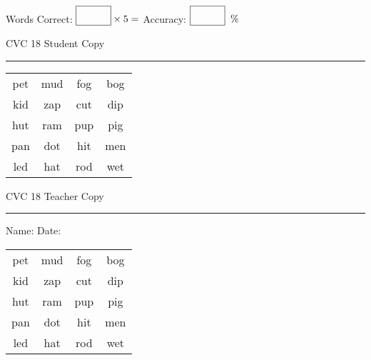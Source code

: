 \documentclass{memoir}
\begin{document}
\small

Words Correct: $\fbox{\phantom{\huge 100}} \times 5 = $ Accuracy: $\fbox{\phantom{\huge 100}}\;\; \%$ 

\vfill

\newpage


\footnotesize \noindent
CVC 18 \hfill Student Copy
\smallskip
\hrule

\Large

\setlength{\tabcolsep}{14pt}
\def\arraystretch{2}

{\selectfont


\begin{vplace}[0.5]
\begin{center}
\begin{tabular}{cccc}
pet & mud & fog & bog \\
kid & zap & cut & dip \\
hut & ram & pup & pig \\
pan & dot & hit & men \\
led & hat & rod & wet \\
\end{tabular}
\end{center}
\end{vplace}

}

\newpage

\footnotesize \noindent
CVC 18 \hfill Teacher Copy
\smallskip
\hrule

\small

\vfill

\noindent
Name: \underline{\hspace{1.75in}} \hfill Date: \underline{\hspace{1in}}

\Large

{\selectfont


\begin{vplace}[0.5]
\begin{center}
\begin{tabular}{cccc}
pet & mud & fog & bog \\
kid & zap & cut & dip \\
hut & ram & pup & pig \\
pan & dot & hit & men \\
led & hat & rod & wet \\
\end{tabular}
\end{center}
\end{vplace}



}
\end{document}
